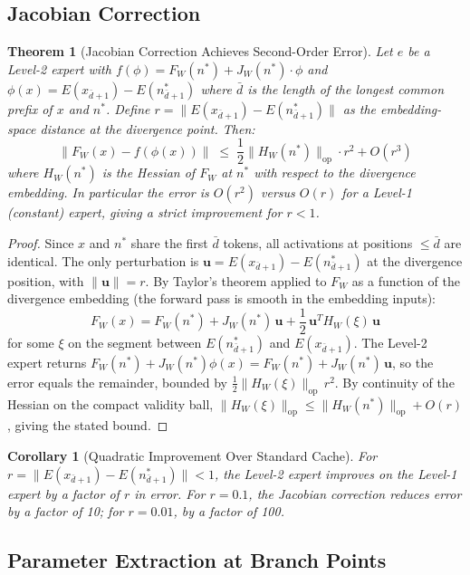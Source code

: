 \documentclass[11pt]{article}
\newtheorem{theorem}{Theorem}
\newtheorem{corollary}{Corollary}
\begin{document}
\subsection{Jacobian Correction}

\begin{theorem}[Jacobian Correction Achieves Second-Order Error]
\label{thm:jacobian}
Let $e$ be a Level-2 expert with $f(\phi) = F_W(n^*) + J_W(n^*) \cdot \phi$
and $\phi(x) = E(x_{\bar{d}+1}) - E(n^*_{\bar{d}+1})$ where $\bar{d}$ is the
length of the longest common prefix of $x$ and $n^*$.  Define
$r = \|E(x_{\bar{d}+1}) - E(n^*_{\bar{d}+1})\|$ as the embedding-space distance
at the divergence point.  Then:
\[
  \|F_W(x) - f(\phi(x))\|
  \;\leq\;
  \frac{1}{2} \|H_W(n^*)\|_{\mathrm{op}} \cdot r^2
  + O(r^3)
\]
where $H_W(n^*)$ is the Hessian of $F_W$ at $n^*$ with respect to the divergence
embedding.  In particular the error is $O(r^2)$ versus $O(r)$ for a Level-1
(constant) expert, giving a strict improvement for $r < 1$.
\end{theorem}

\begin{proof}
Since $x$ and $n^*$ share the first $\bar{d}$ tokens, all activations at
positions $\leq \bar{d}$ are identical.  The only perturbation is
$\mathbf{u} = E(x_{\bar{d}+1}) - E(n^*_{\bar{d}+1})$ at the divergence position,
with $\|\mathbf{u}\| = r$.  By Taylor's theorem applied to $F_W$ as a function of
the divergence embedding (the forward pass is smooth in the embedding inputs):
\[
  F_W(x) = F_W(n^*) + J_W(n^*)\,\mathbf{u} + \frac{1}{2}\,\mathbf{u}^T H_W(\xi)\,\mathbf{u}
\]
for some $\xi$ on the segment between $E(n^*_{\bar{d}+1})$ and $E(x_{\bar{d}+1})$.
The Level-2 expert returns $F_W(n^*) + J_W(n^*)\phi(x) = F_W(n^*) + J_W(n^*)\,\mathbf{u}$,
so the error equals the remainder, bounded by
$\frac{1}{2}\|H_W(\xi)\|_{\mathrm{op}}\,r^2$.  By continuity of the Hessian on
the compact validity ball, $\|H_W(\xi)\|_{\mathrm{op}} \leq \|H_W(n^*)\|_{\mathrm{op}}
+ O(r)$, giving the stated bound.
\end{proof}

\begin{corollary}[Quadratic Improvement Over Standard Cache]
For $r = \|E(x_{\bar{d}+1}) - E(n^*_{\bar{d}+1})\| < 1$, the Level-2 expert
improves on the Level-1 expert by a factor of $r$ in error.  For $r = 0.1$,
the Jacobian correction reduces error by a factor of 10; for $r = 0.01$,
by a factor of 100.
\end{corollary}

\subsection{Parameter Extraction at Branch Points}
\end{document}
